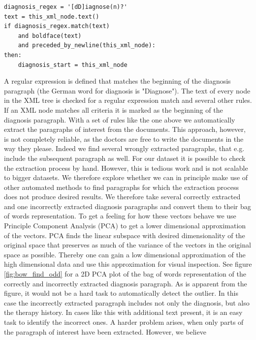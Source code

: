 \begin{lstlisting}
diagnosis_regex = '[dD]iagnose(n)?'
text = this_xml_node.text()
if diagnosis_regex.match(text)
	and boldface(text)
	and preceded_by_newline(this_xml_node):
then:
	diagnosis_start = this_xml_node
\end{lstlisting}

\bigskip

A regular expression is defined that matches the beginning of the diagnosis paragraph (the German word for diagnosis is "Diagnose").
The text of every node in the XML tree is checked for a regular expression match and several other rules. If an XML node matches all criteria it is marked as the beginning of the diagnosis paragraph.
With a set of rules like the one above we automatically extract the
paragraphs of interest from the documents. This approach, however,
is not completely reliable, as the doctors are free to write the documents
in the way they please. Indeed we find several wrongly extracted paragraphs,
that e.g. include the subsequent paragraph as well. For our dataset
it is possible to check the extraction process by hand. However, this
is tedious work and is not scalable to bigger
datasets. We therefore explore whether we can in principle make use
of other automated methods to find paragraphs for which the extraction
process does not produce desired results. We therefore take several correctly extracted and one incorrectly extracted
diagnosis paragraphs and convert them to their bag of words representation.
To get a feeling for how these vectors behave we use Principle Component
Analysis (PCA) to get a lower dimensional approximation of the vectors. PCA finds the linear
subspace with desired dimensionality of the original space that preserves as much of the variance of the vectors in the original space as possible. Thereby one can gain a low dimensional approximation of the high dimensional data and use this approximation for visual inspection.
See figure \ref{fig:bow_find_odd} for a 2D PCA plot of the bag of words representation
of the correctly and incorrectly extracted diagnosis paragraph. As is apparent from the figure, it would not be a
hard task to automatically detect the outlier. In this case the incorrectly
extracted paragraph includes not only the diagnosis, but also the
therapy history. In cases like this with additional text present, it is an easy task to
identify the incorrect ones. A harder problem arises, when only parts
of the paragraph of interest have been extracted. However, we believe
